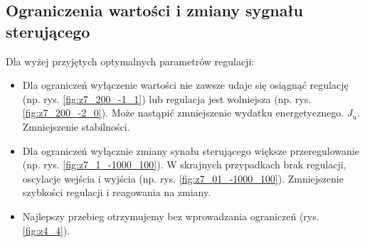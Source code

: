 \documentclass[a4paper, 10pt]{article}
\begin{document}
	\subsection{Ograniczenia wartości i zmiany sygnału sterującego}
	Dla wyżej przyjętych optymalnych parametrów regulacji:
	\begin{itemize}
	\item Dla ograniczeń wyłączenie wartości nie zawsze udaje się osiągnąć regulację (np. rys. \ref{fig:z7_200_-1_1}) lub regulacja jest wolniejsza (np. rys. \ref{fig:z7_200_-2_0}). Może nastąpić zmniejszenie wydatku energetycznego. $J_u$. Zmniejszenie stabilności.
	
	\item Dla ograniczeń wyłącznie zmiany synału sterującego większe przeregulowanie (np. rys. \ref{fig:z7_1_-1000_100}). W skrajnych przypadkach brak regulacji, oscylacje wejścia i wyjścia (np. rys. \ref{fig:z7_01_-1000_100}). Zmniejszenie szybkości regulacji i reagowania na zmiany. 
	
	\item  Najlepszy przebieg otrzymujemy bez wprowadzania ograniczeń (rys. \ref{fig:z4_4}).
	\end{itemize}
	
\end{document}
